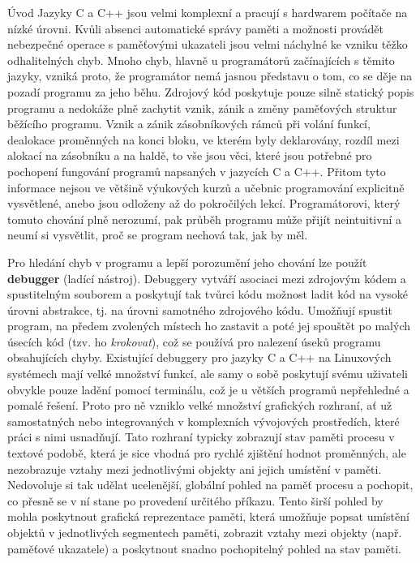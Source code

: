 \documentclass[czech,bachelor,male,python,dept460]{diploma}						%
\newcommand{\parspace}[1][]{
	\ifthenelse{\isempty{#1}}{\vspace{5mm}}{\vspace{#1}}
	\par
}
\begin{document}
\MakeTitlePages

\begin{section}{Úvod}
	Jazyky C a C++ jsou velmi komplexní a pracují s hardwarem počítače na nízké úrovni.
	Kvůli absenci automatické správy paměti a možnosti provádět nebezpečné operace s paměťovými ukazateli jsou velmi náchylné ke vzniku těžko odhalitelných chyb.
	Mnoho chyb, hlavně u programátorů začínajících s těmito jazyky, vzniká proto, že programátor nemá jasnou představu o tom, co se děje na pozadí programu za
	jeho běhu. Zdrojový kód poskytuje pouze silně statický popis programu a nedokáže plně zachytit vznik, zánik a změny paměťových struktur běžícího programu.
	Vznik a zánik zásobníkových rámců při volání funkcí, dealokace proměnných na konci bloku, ve kterém byly deklarovány, rozdíl mezi alokací na zásobníku a na haldě,
	to vše jsou věci, které jsou potřebné pro pochopení fungování programů napsaných v jazycích C a C++. Přitom tyto informace nejsou ve většině výukových kurzů
	a učebnic programování explicitně vysvětlené, anebo jsou odloženy až do pokročilých lekcí. Programátorovi, který tomuto chování plně nerozumí,
	pak průběh programu může přijít neintuitivní a neumí si vysvětlit, proč se program nechová tak, jak by měl.
	
	\parspace Pro hledání chyb v programu a lepší porozumění jeho chování lze použít \textbf{debugger} (ladící nástroj).
	Debuggery vytváří asociaci mezi zdrojovým kódem a spustitelným souborem a poskytují tak tvůrci kódu možnost ladit kód
	na vysoké úrovni abstrakce, tj. na úrovni samotného zdrojového kódu. Umožňují spustit program, na předem zvolených místech ho zastavit a poté jej spouštět
	po malých úsecích kód (tzv. ho \textit{krokovat}), což se používá pro nalezení úseků programu obsahujících chyby. Existující debuggery pro jazyky C a C++ na
	Linuxových systémech mají velké množství funkcí, ale samy o sobě poskytují svému uživateli obvykle pouze ladění pomocí terminálu, což je u větších programů
	nepřehledné a pomalé řešení. Proto pro ně vzniklo velké množství grafických rozhraní, ať už samostatných nebo integrovaných v komplexních vývojových prostředích,
	které práci s nimi usnadňují. Tato rozhraní typicky zobrazují stav paměti procesu v textové podobě, která je sice vhodná pro rychlé
	zjištění hodnot proměnných, ale nezobrazuje vztahy mezi jednotlivými objekty ani jejich umístění v paměti.
	Nedovoluje si tak udělat ucelenější, globální pohled na paměť procesu a pochopit, co přesně se v ní stane po provedení určitého příkazu.
	Tento širší pohled by mohla poskytnout grafická reprezentace paměti, která umožňuje popsat umístění objektů v jednotlivých segmentech paměti,
	zobrazit vztahy mezi objekty (např. paměťové ukazatele) a poskytnout snadno pochopitelný pohled na stav paměti.
	

\end{section}
\end{document}
